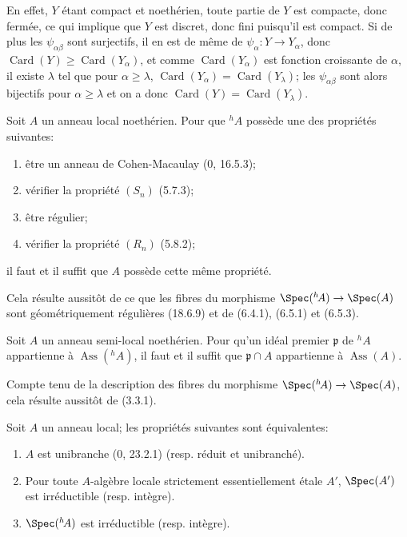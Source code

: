 En effet, $Y$ étant compact et noethérien, toute partie de $Y$ est compacte, donc fermée, ce qui implique que $Y$ est discret, donc fini puisqu'il est compact. Si de plus les $\psi_{\alpha\beta}$ sont surjectifs, il en est de même de $\psi_\alpha:Y\to Y_\alpha$, donc $\operatorname{Card}(Y)\geq\operatorname{Card}(Y_\alpha)$, et comme $\operatorname{Card}(Y_\alpha)$ est fonction croissante de $\alpha$, il existe $\lambda$ tel que pour $\alpha\geq\lambda$, $\operatorname{Card}(Y_\alpha)=\operatorname{Card}(Y_\lambda)$; les $\psi_{\alpha\beta}$ sont alors bijectifs pour $\alpha\geq\lambda$ et on a donc $\operatorname{Card}(Y)=\operatorname{Card}(Y_\lambda)$.

\begin{corollary}[18.6.10]
\label{IV.18.6.10}
Soit $A$ un anneau local noethérien. Pour que ${}^h\!A$ possède une des propriétés suivantes:
\begin{enumerate}
  \item[$a)$] être un anneau de Cohen-Macaulay (0, 16.5.3);
  \item[$b)$] vérifier la propriété $(S_n)$ (5.7.3);
  \item[$c)$] être régulier;
  \item[$d)$] vérifier la propriété $(R_n)$ (5.8.2);
\end{enumerate}
il faut et il suffit que $A$ possède cette même propriété.
\end{corollary}


Cela résulte aussitôt de ce que les fibres du morphisme $\Spec({}^h\!A)\to\Spec(A)$ sont géométriquement régulières (18.6.9) et de (6.4.1), (6.5.1) et (6.5.3).

\begin{corollary}[18.6.11]
\label{IV.18.6.11}
Soit $A$ un anneau semi-local noethérien. Pour qu'un idéal premier $\mathfrak p$ de ${}^h\!A$ appartienne à $\operatorname{Ass}({}^h\!A)$, il faut et il suffit que $\mathfrak p\cap A$ appartienne à $\operatorname{Ass}(A)$.
\end{corollary}

Compte tenu de la description des fibres du morphisme $\Spec({}^h\!A)\to\Spec(A)$, cela résulte aussitôt de (3.3.1).

\begin{proposition}[18.6.12]
\label{IV.18.6.12}
Soit $A$ un anneau local; les propriétés suivantes sont équivalentes:
\begin{enumerate}
  \item[$a)$] $A$ est unibranche (0, 23.2.1) (resp. réduit et unibranché).
  \item[$b)$] Pour toute $A$-algèbre locale strictement essentiellement étale $A'$, $\Spec(A')$ est irréductible (resp. intègre).
  \item[$c)$] $\Spec({}^h\!A)$ est irréductible (resp. intègre).
\end{enumerate}
\end{proposition}


